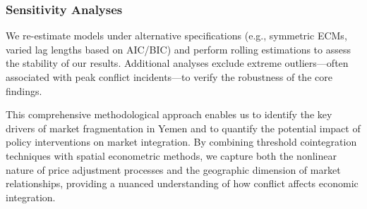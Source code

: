 \subsubsection{Sensitivity Analyses}

We re-estimate models under alternative specifications (e.g., symmetric ECMs, varied lag lengths based on AIC/BIC) and perform rolling estimations to assess the stability of our results. Additional analyses exclude extreme outliers—often associated with peak conflict incidents—to verify the robustness of the core findings.

This comprehensive methodological approach enables us to identify the key drivers of market fragmentation in Yemen and to quantify the potential impact of policy interventions on market integration. By combining threshold cointegration techniques with spatial econometric methods, we capture both the nonlinear nature of price adjustment processes and the geographic dimension of market relationships, providing a nuanced understanding of how conflict affects economic integration.